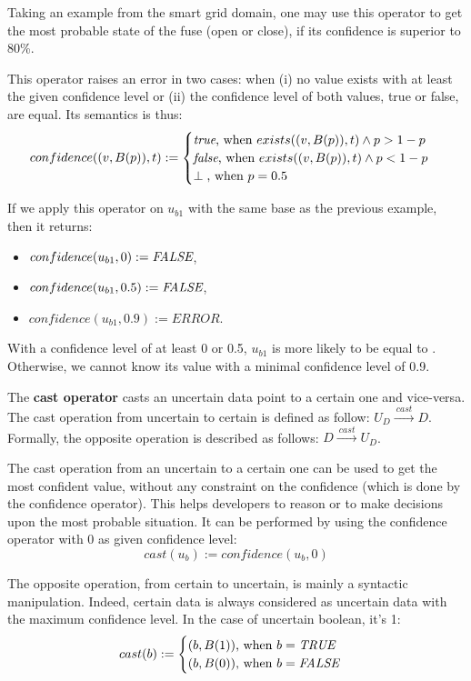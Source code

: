 Taking an example from the smart grid domain, one may use this operator to get the most probable state of the fuse (open or close), if its confidence is superior to 80\%.

This operator raises an error in two cases: when (i) no value exists with at least the given confidence level or (ii) the confidence level of both values, true or false, are equal.
Its semantics is thus:
\[confidence((v, B(p)), t) := \begin{cases}
												\text{\textit{true}, when } exists((v, B(p)), t) \land p >  1-p \\
												\text{\textit{false}, when } exists((v, B(p)), t) \land p < 1-p \\
												\perp \text{, when } p = 0.5
											\end{cases}\]
												
If we apply this operator on $u_{b1}$ with the same base as the previous example, then it returns:
\begin{itemize}
	\item $confidence(u_{b1}, 0) := \textit{FALSE}{}$,
	\item $confidence(u_{b1}, 0.5) := \textit{FALSE}{}$,
	\item $confidence(u_{b1}, 0.9) := ERROR$.
\end{itemize}
With a confidence level of at least 0 or 0.5, $u_{b1}$ is more likely to be equal to \false{}.
Otherwise, we cannot know its value with a minimal confidence level of 0.9.

\begin{operator}
	\label{op:cast}
	The \textbf{cast operator} casts an uncertain data point to a certain one and vice-versa. 
	The cast operation from uncertain to certain is defined as follow: $U_D \xrightarrow{~cast~} D$.
	Formally, the opposite operation is described as follows: $D \xrightarrow{~cast~} U_D$.
\end{operator}

The cast operation from an uncertain to a certain one can be used to get the most confident value, without any constraint on the confidence (which is done by the confidence operator).
This helps developers to reason or to make decisions upon the most probable situation.
It can be performed by using the confidence operator with 0 as given confidence level:
\[cast(u_b) := confidence(u_b, 0)\]

The opposite operation, from certain to uncertain, is mainly a syntactic manipulation.
Indeed, certain data is always considered as uncertain data with the maximum confidence level.
In the case of uncertain boolean, it's 1:
\[cast(b) := \begin{cases}
                        (b, B(1)) \text{, when } b = \textit{TRUE}{}\\
                        (b, B(0)) \text{, when } b = \textit{FALSE}{}
                    \end{cases}\]
  
